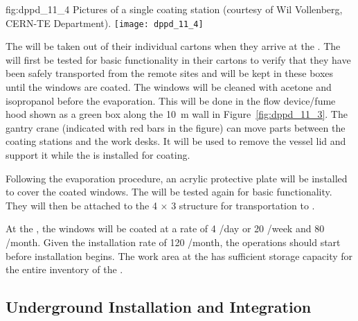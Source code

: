 \begin{dunefigure}{fig:dppd_11_4}
{Pictures of a single  coating station (courtesy of Wil Vollenberg, CERN-TE Department).}
\texttt{[image: dppd\_11\_4]}
\end{dunefigure}

The  will be taken out of their individual cartons when they arrive at the . The  will first be tested for basic functionality in their cartons to verify that they have been safely transported from the remote sites and will be kept in these boxes until the windows are coated. The  windows will be cleaned with acetone and isopropanol before the evaporation. This will be done in the flow device/fume hood shown as a green box along the \SI{10}{\m} wall in Figure~\ref{fig:dppd_11_3}. The gantry crane (indicated with red bars in the figure) can move parts between the coating stations and the work desks. It will be used to remove the vessel lid and support it while the  is installed for coating.

Following the evaporation procedure, an acrylic protective plate will be installed to cover the coated  windows.
The  will be tested again for basic functionality. They will then be attached to the \num{4} $\times$ \num{3} structure for transportation to \surf.

At the , the  windows will be coated at a rate of \num{4} /day or \num{20} /week and \num{80} /month. Given the installation rate of \num{120} /month, the  operations should start before installation begins. The  work area at the  has sufficient storage capacity for the entire  inventory of the . 

\subsection{Underground Installation and Integration}
\label{subsec:dp-pds-undergroundinstallation}

